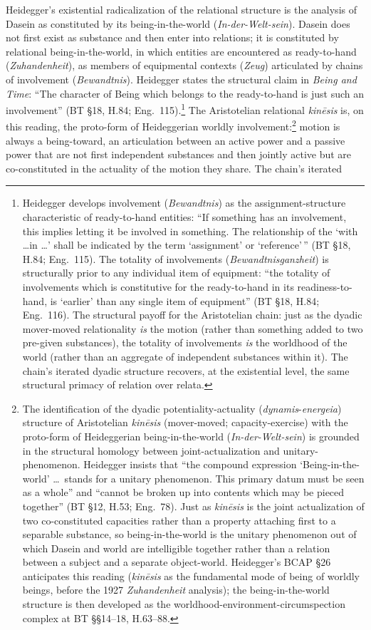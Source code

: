 \documentclass{article}
\begin{document}
Heidegger's existential radicalization of the relational structure is the analysis of Dasein as constituted by its being-in-the-world (\textit{In-der-Welt-sein}). Dasein does not first exist as substance and then enter into relations; it is constituted by relational being-in-the-world, in which entities are encountered as ready-to-hand (\textit{Zuhandenheit}), as members of equipmental contexts (\textit{Zeug}) articulated by chains of involvement (\textit{Bewandtnis}). Heidegger states the structural claim in \textit{Being and Time}: ``The character of Being which belongs to the ready-to-hand is just such an involvement'' (BT \S 18, H.84; Eng.~115).\footnote{Heidegger develops involvement (\textit{Bewandtnis}) as the assignment-structure characteristic of ready-to-hand entities: ``If something has an involvement, this implies letting it be involved in something. The relationship of the `with \ldots in \ldots ' shall be indicated by the term `assignment' or `reference'\,'' (BT §18, H.84; Eng.~115). The totality of involvements (\textit{Bewandtnisganzheit}) is structurally prior to any individual item of equipment: ``the totality of involvements which is constitutive for the ready-to-hand in its readiness-to-hand, is `earlier' than any single item of equipment'' (BT §18, H.84; Eng.~116). The structural payoff for the Aristotelian chain: just as the dyadic mover-moved relationality \textit{is} the motion (rather than something added to two pre-given substances), the totality of involvements \textit{is} the worldhood of the world (rather than an aggregate of independent substances within it). The chain's iterated dyadic structure recovers, at the existential level, the same structural primacy of relation over relata.} The Aristotelian relational \textit{kinēsis} is, on this reading, the proto-form of Heideggerian worldly involvement:\footnote{The identification of the dyadic potentiality-actuality (\textit{dynamis}-\textit{energeia}) structure of Aristotelian \textit{kinēsis} (mover-moved; capacity-exercise) with the proto-form of Heideggerian being-in-the-world (\textit{In-der-Welt-sein}) is grounded in the structural homology between joint-actualization and unitary-phenomenon. Heidegger insists that ``the compound expression `Being-in-the-world' \ldots\ stands for a unitary phenomenon. This primary datum must be seen as a whole'' and ``cannot be broken up into contents which may be pieced together'' (BT §12, H.53; Eng.~78). Just as \textit{kinēsis} is the joint actualization of two co-constituted capacities rather than a property attaching first to a separable substance, so being-in-the-world is the unitary phenomenon out of which Dasein and world are intelligible together rather than a relation between a subject and a separate object-world. Heidegger's BCAP §26 anticipates this reading (\textit{kinēsis} as the fundamental mode of being of worldly beings, before the 1927 \textit{Zuhandenheit} analysis); the being-in-the-world structure is then developed as the worldhood-environment-circumspection complex at BT §§14--18, H.63--88.} motion is always a being-toward, an articulation between an active power and a passive power that are not first independent substances and then jointly active but are co-constituted in the actuality of the motion they share. The chain's iterated 
\end{document}
